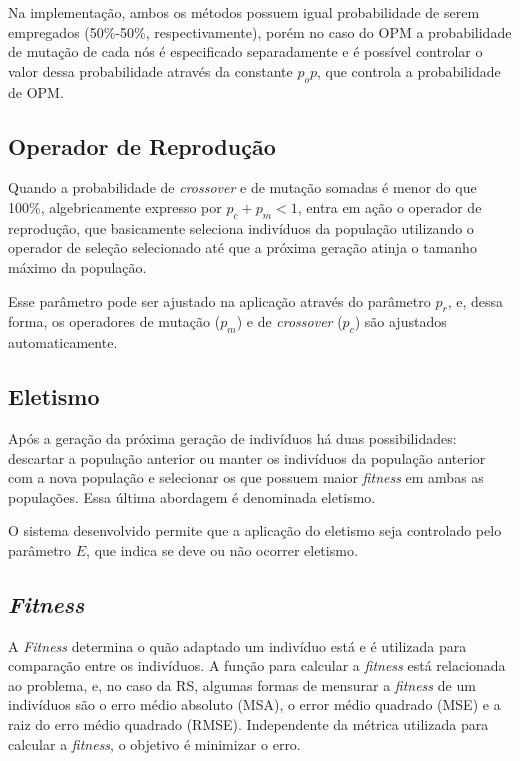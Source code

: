 \documentclass[a4paper]{article}
\begin{document}
Na implementação, ambos os métodos possuem igual probabilidade de serem
empregados (50\%-50\%, respectivamente), porém no caso do OPM a probabilidade de
mutação de cada nós é especificado separadamente e é possível controlar o valor
dessa probabilidade através da constante $p_op$, que controla a probabilidade de
OPM.

\subsection{Operador de Reprodução} \label{subsec:reproduction}

Quando a probabilidade de \textit{crossover} e de mutação somadas é menor do que
100\%, algebricamente expresso por $p_c + p_m < 1$, entra em ação o operador
de reprodução, que basicamente seleciona indivíduos da população utilizando
o operador de seleção selecionado até que a próxima geração atinja o tamanho
máximo da população.

Esse parâmetro pode ser ajustado na aplicação através do parâmetro $p_r$, e,
dessa forma, os operadores de mutação ($p_m$) e de \textit{crossover} ($p_c$)
são ajustados automaticamente.

\subsection{Eletismo}

Após a geração da próxima geração de indivíduos há duas possibilidades:
descartar a população anterior ou manter os indivíduos da população anterior
com a nova população e selecionar os que possuem maior \textit{fitness} em ambas
as populações. Essa última abordagem é denominada eletismo.

O sistema desenvolvido permite que a aplicação do eletismo seja controlado pelo
parâmetro $E$, que indica se deve ou não ocorrer eletismo.

\subsection{\textit{Fitness}}

A \textit{Fitness} determina o quão adaptado um indivíduo está e é utilizada
para comparação entre os indivíduos. A função para calcular a \textit{fitness}
está relacionada ao problema, e, no caso da RS, algumas formas de mensurar a
\textit{fitness} de um indivíduos são o erro médio absoluto (MSA), o error médio
quadrado (MSE) e a raiz do erro médio quadrado (RMSE). Independente da métrica
utilizada para calcular a \textit{fitness}, o objetivo é minimizar o erro.
\end{document}
